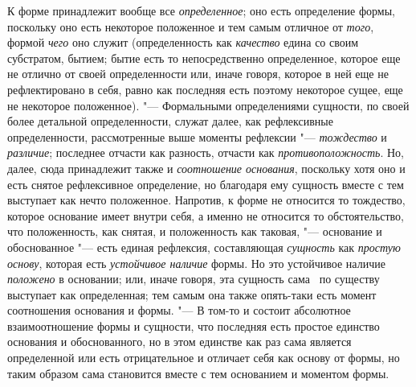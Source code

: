 К форме принадлежит вообще все {\em определенное}; оно
есть определение формы, поскольку оно есть некоторое положенное и тем самым
отличное от {\em того}, формой
{\em чего} оно служит (определенность как
{\em качество} едина со своим субстратом, бытием; бытие
есть то непосредственно определенное, которое еще не отлично от своей
определенности или, иначе говоря, которое в ней еще не рефлектировано в
себя, равно как последняя есть поэтому некоторое сущее, еще не некоторое
положенное). "--- Формальными определениями сущности, по своей более детальной
определенности, служат далее, как рефлексивные определенности,
рассмотренные выше моменты рефлексии "--- {\em тождество}
и {\em различие}; последнее отчасти как разность,
отчасти как {\em противоположность}. Но, далее, сюда
принадлежит также и {\em соотношение основания},
поскольку хотя оно и есть снятое рефлексивное определение, но благодаря ему
сущность вместе с тем выступает как нечто положенное. Напротив, к форме не
относится то тождество, которое основание имеет внутри себя, а именно не
относится то обстоятельство, что положенность, как снятая, и положенность
как таковая, "--- основание и обоснованное "--- есть единая рефлексия,
составляющая {\em сущность} как
{\em простую основу}, которая есть
{\em устойчивое наличие} формы. Но это устойчивое
наличие {\em положено} в основании; или, иначе говоря,
эта сущность сама \ по существу выступает как определенная; тем самым она
также опять-таки есть момент соотношения основания и формы. "--- В том-то и
состоит абсолютное взаимоотношение формы и сущности, что последняя есть
простое единство основания и обоснованного, но в этом единстве как раз сама
является определенной или есть отрицательное и отличает себя как основу от
формы, но таким образом сама становится вместе с тем основанием и моментом
формы.


